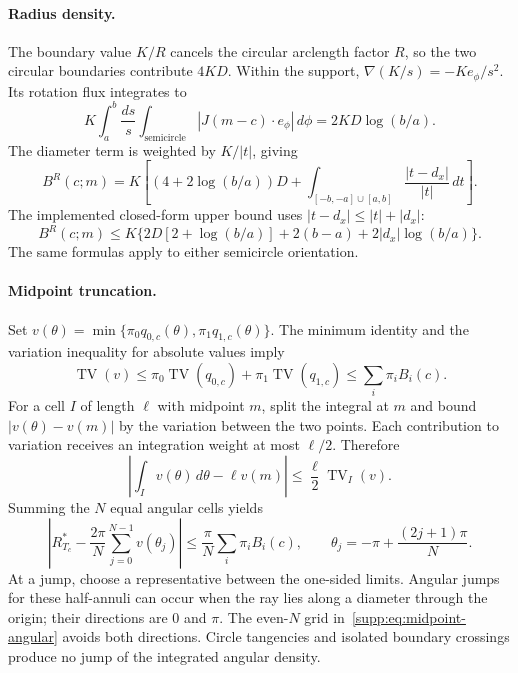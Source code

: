 \paragraph{Radius density.}
The boundary value $K/R$ cancels the circular arclength factor $R$, so the two circular boundaries contribute $4KD$. Within the support,
$\nabla(K/s)=-Ke_\phi/s^2$. Its rotation flux integrates to
\[
 K\int_a^b\frac{ds}{s}
   \int_{\text{semicircle}}|J(m-c)\cdot e_\phi|\,d\phi
 =2KD\log(b/a).
\]
The diameter term is weighted by $K/|t|$, giving
\begin{equation}
 B^R(c;m)=K\left[(4+2\log(b/a))D+
       \int_{[-b,-a]\cup[a,b]}\frac{|t-d_x|}{|t|}\,dt\right].
 \label{supp:eq:bv-radius}
\end{equation}
The implemented closed-form upper bound uses $|t-d_x|\leq|t|+|d_x|$:
\begin{equation}
 B^R(c;m)\leq
 K\{2D[2+\log(b/a)]+2(b-a)+2|d_x|\log(b/a)\}.
 \label{supp:eq:bv-radius-implemented}
\end{equation}
The same formulas apply to either semicircle orientation.

\paragraph{Midpoint truncation.}
Set $v(\theta)=\min\{\pi_0q_{0,c}(\theta),\pi_1q_{1,c}(\theta)\}$. The minimum identity and the variation inequality for absolute values imply
\[
 \operatorname{TV}(v)\leq\pi_0\operatorname{TV}(q_{0,c})
                       +\pi_1\operatorname{TV}(q_{1,c})
 \leq\sum_i\pi_iB_i(c).
\]
For a cell $I$ of length $\ell$ with midpoint $m$, split the integral at $m$ and bound $|v(\theta)-v(m)|$ by the variation between the two points. Each contribution to variation receives an integration weight at most $\ell/2$. Therefore
\[
 \left|\int_Iv(\theta)\,d\theta-\ell v(m)\right|
 \leq\frac\ell2\operatorname{TV}_I(v).
\]
Summing the $N$ equal angular cells yields
\begin{equation}
 \left|R^*_{T_c}-\frac{2\pi}{N}
       \sum_{j=0}^{N-1}v(\theta_j)\right|
 \leq\frac\pi N\sum_i\pi_i B_i(c),
 \qquad\theta_j=-\pi+\frac{(2j+1)\pi}{N}.
 \label{supp:eq:midpoint-angular}
\end{equation}
At a jump, choose a representative between the one-sided limits. Angular jumps for these half-annuli can occur when the ray lies along a diameter through the origin; their directions are $0$ and $\pi$. The even-$N$ grid in~\eqref{supp:eq:midpoint-angular} avoids both directions. Circle tangencies and isolated boundary crossings produce no jump of the integrated angular density.

